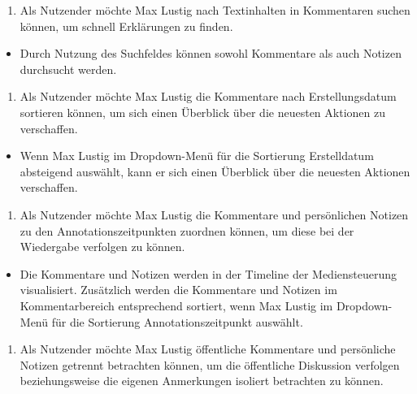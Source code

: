 \vspace{0.25cm}
\begin{enumerate}[resume*]
\item \label{US-Suche-Eval} Als Nutzender möchte Max Lustig nach Textinhalten in Kommentaren suchen können, um schnell Erklärungen zu finden.
\end{enumerate}
\vspace{-0.1cm}
\begin{itemize}
\item[\Checkmark]
Durch Nutzung des Suchfeldes können sowohl Kommentare als auch Notizen durchsucht werden.
\end{itemize}
\vspace{0.25cm}
\begin{enumerate}[resume*]
\item \label{US-Sortierung-Erstellungsdatum-Eval} Als Nutzender möchte Max Lustig die Kommentare nach Erstellungsdatum sortieren können, um sich einen Überblick über die neuesten Aktionen zu verschaffen.
\end{enumerate}
\vspace{-0.1cm}
\begin{itemize}
\item[\Checkmark]
Wenn Max Lustig im Dropdown-Menü für die Sortierung \glqq Erstelldatum absteigend\grqq{} auswählt, kann er sich einen Überblick über die neuesten Aktionen verschaffen.
\end{itemize}
\vspace{0.25cm}
\begin{enumerate}[resume*]
\item \label{US-Sortierung-Zeitpunkt-Eval} Als Nutzender möchte Max Lustig die Kommentare und persönlichen Notizen zu den Annotationszeitpunkten zuordnen können, um diese bei der Wiedergabe verfolgen zu können.
\end{enumerate}
\vspace{-0.1cm}
\begin{itemize}
\item[\Checkmark]
Die Kommentare und Notizen werden in der Timeline der Mediensteuerung visualisiert. Zusätzlich werden die Kommentare und Notizen im Kommentarbereich entsprechend sortiert, wenn Max Lustig im Dropdown-Menü für die Sortierung \glqq Annotationszeitpunkt\grqq{} auswählt.
\end{itemize}
\vspace{0.25cm}
\begin{enumerate}[resume*]
\item \label{US-Filter-Eval} Als Nutzender möchte Max Lustig öffentliche Kommentare und persönliche Notizen getrennt betrachten können, um die öffentliche Diskussion verfolgen beziehungsweise die eigenen Anmerkungen isoliert betrachten zu können.
\end{enumerate}
